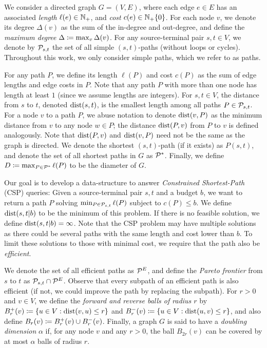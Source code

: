 We consider a directed graph $G=(V,E)$, where each edge $e\in E$ has an associated \emph{length} $\ell(e)\in\mathbb{N}_+$, and \emph{cost} $c(e)\in\mathbb{N}_+\{0\}$.
For each node $v$, we denote its degree $\Delta(v)$ as the sum of the in-degree and out-degree, and define the \emph{maximum degree} $\Delta \coloneqq \max_v\Delta(v)$.
For any source-terminal pair $s,t\in V$, we denote by $\mathcal{P}_{s,t}$ the set of all simple $(s,t)$-paths (without loops or cycles). 
Throughout this work, we only consider simple paths, which we refer to as paths.

For any path $P$, we define its length $\ell(P)$ and cost $c(P)$ as the sum of edge lengths and edge costs in $P$. 
Note that any path $P$ with more than one node has length at least $1$ (since we assume lengths are integers).
For $s,t\in V$, the distance from $s$ to $t$, denoted $\mbox{dist}(s,t)$, is the smallest length among all paths $P\in\mathcal{P}_{s,t}$.
For a node $v$ to a path $P$, we abuse notation to denote $\mbox{dist}(v,P)$ as the minimum distance from $v$ to any node $w\in P$; the distance $\mbox{dist}(P,v)$ from $P$ to $v$ is defined analogously.
Note that  $\mbox{dist}(P,v)$ and  $\mbox{dist}(v,P)$ need not be the same as the graph is directed.
We denote the shortest $(s,t)$-path (if it exists) as $P(s,t)$, and denote the set of all shortest paths in $G$ as $\mathcal{P}^*$.
Finally, we define $D\coloneqq\max_{P\in\mathcal{P}^*}\ell(P)$ to be the diameter of $G$.

Our goal is to develop a data-structure to answer \emph{Constrained Shortest-Path} (CSP) queries: 
Given a source-terminal pair $s,t$ and a budget $b$, we want to return a path $P$ solving
$\min_{P \in \mathcal{P}_{s,t}} \ell(P)$
subject to $c(P) \leq b$.
We define $\mbox{dist}(s,t|b)$ to be the minimum of this problem.
If there is no feasible solution, we define $\mbox{dist}(s,t|b)=\infty$.
Note that the CSP problem may have multiple solutions as there could be several paths with the same length and cost lower than $b$.
To limit these solutions to those with minimal cost, we require that the path also be \emph{efficient}. 
We denote the set of all efficient paths as $\mathcal{P}^E$, and define the \emph{Pareto frontier} from $s$ to $t$ as $\mathcal{P}_{s,t}\cap\mathcal{P}^E$.
Observe that every subpath of an efficient path is also efficient (if not, we could improve the path by replacing the subpath).
For $r>0$ and $v\in V$, we define the \emph{forward and reverse balls of radius $r$} by $B^+_r(v)\coloneqq\{u\in V: \mbox{dist}(v,u)\leq r\}$ and $B^-_r(v)\coloneqq\{u\in V: \mbox{dist}(u,v)\leq r\}$, and also define $B_r(v)\coloneqq B^+_r(v)\cup B^-_r(v)$.
Finally, a graph $G$ is said to have a \emph{doubling dimension} $\alpha$ if, for any node $v$ and any $r>0$, the ball $B_{2r}(v)$ can be covered by at most $\alpha$ balls of radius $r$.


